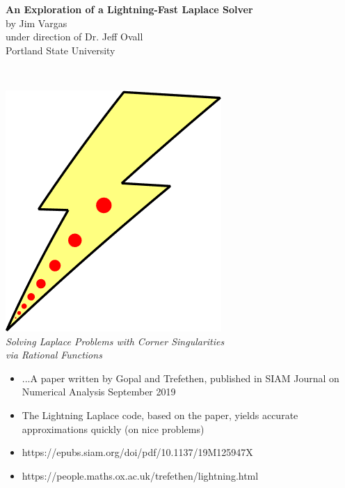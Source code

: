 \documentclass{seminar}
\begin{document}
 
\pagestyle{headings}
\centerslidesfalse

\begin{slide} %
\vspace*{\fill}
\begin{center}
{\large\bf\color{Green} An Exploration of a Lightning-Fast Laplace Solver}\\
by Jim Vargas\\
under direction of Dr. Jeff Ovall\\
Portland State University\\
\end{center}
\vspace*{\fill}
\end{slide} %




\begin{slide} %
{} \small \\

\begin{center}
	\includegraphics[scale=0.2]{./PNG/llogo}\\
	\large{\emph{Solving Laplace Problems with Corner Singularities\\ via Rational Functions}}
\end{center}

\begin{itemize}
	\item ...A paper written by Gopal and Trefethen, published in SIAM Journal on Numerical Analysis September 2019
	\item The Lightning Laplace code, based on the paper, yields accurate approximations quickly (on nice problems)
	\item https://epubs.siam.org/doi/pdf/10.1137/19M125947X
	\item https://people.maths.ox.ac.uk/trefethen/lightning.html
\end{itemize}
\end{slide} %
\end{document}
